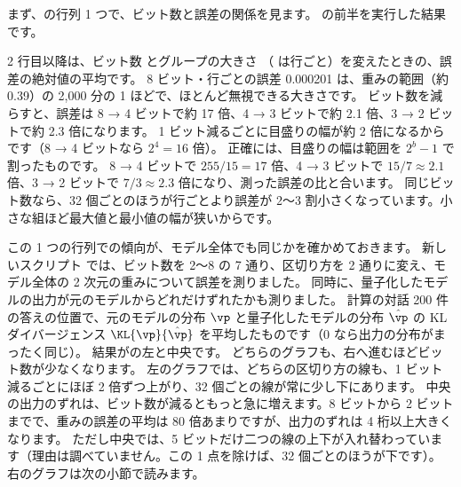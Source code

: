 まず、の行列 1 つで、ビット数と誤差の関係を見ます。
 の前半を実行した結果です。


2 行目以降は、ビット数  とグループの大きさ （ は行ごと）を変えたときの、誤差の絶対値の平均です。
8 ビット・行ごとの誤差 0.000201 は、重みの範囲（約 0.39）の 2,000 分の 1 ほどで、ほとんど無視できる大きさです。
ビット数を減らすと、誤差は 8 → 4 ビットで約 17 倍、4 → 3 ビットで約 2.1 倍、3 → 2 ビットで約 2.3 倍になります。
1 ビット減るごとに目盛りの幅が約 2 倍になるからです（8 → 4 ビットなら $2^4=16$ 倍）。
正確には、目盛りの幅は範囲を $2^b-1$ で割ったものです。
8 → 4 ビットで $255/15=17$ 倍、4 → 3 ビットで $15/7\approx2.1$ 倍、3 → 2 ビットで $7/3\approx2.3$ 倍になり、測った誤差の比と合います。
同じビット数なら、32 個ごとのほうが行ごとより誤差が 2〜3 割小さくなっています。小さな組ほど最大値と最小値の幅が狭いからです。

この 1 つの行列での傾向が、モデル全体でも同じかを確かめておきます。
新しいスクリプト  では、ビット数を 2〜8 の 7 通り、区切り方を 2 通りに変え、モデル全体の 2 次元の重みについて誤差を測りました。
同時に、量子化したモデルの出力が元のモデルからどれだけずれたかも測りました。
計算の対話 200 件の答えの位置で、元のモデルの分布 $\vp$ と量子化したモデルの分布 $\hat{\vp}$ の KL ダイバージェンス $\KL{\vp}{\hat{\vp}}$ を平均したものです（0 なら出力の分布がまったく同じ）。
結果がの左と中央です。
どちらのグラフも、右へ進むほどビット数が少なくなります。
左のグラフでは、どちらの区切り方の線も、1 ビット減るごとにほぼ 2 倍ずつ上がり、32 個ごとの線が常に少し下にあります。
中央の出力のずれは、ビット数が減るともっと急に増えます。8 ビットから 2 ビットまでで、重みの誤差の平均は 80 倍あまりですが、出力のずれは 4 桁以上大きくなります。
ただし中央では、5 ビットだけ二つの線の上下が入れ替わっています（理由は調べていません。この 1 点を除けば、32 個ごとのほうが下です）。
右のグラフは次の小節で読みます。

